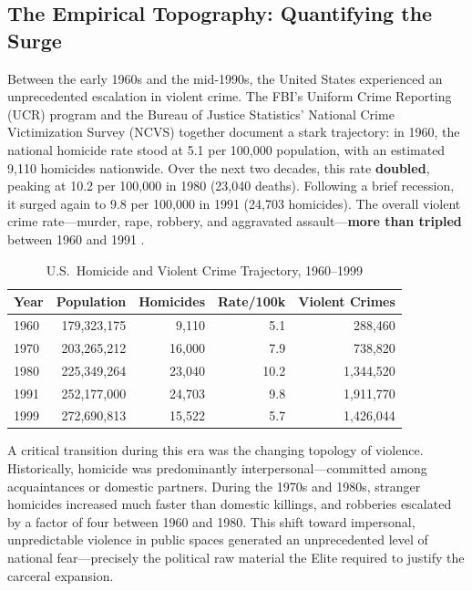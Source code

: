 \documentclass[12pt,openany]{book}
\begin{document}
\subsection{The Empirical Topography: Quantifying the Surge}

Between the early 1960s and the mid-1990s, the United States experienced an unprecedented escalation in violent crime. The FBI's Uniform Crime Reporting (UCR) program and the Bureau of Justice Statistics' National Crime Victimization Survey (NCVS) together document a stark trajectory: in 1960, the national homicide rate stood at 5.1 per 100,000 population, with an estimated 9,110 homicides nationwide. Over the next two decades, this rate \textbf{doubled}, peaking at 10.2 per 100,000 in 1980 (23,040 deaths). Following a brief recession, it surged again to 9.8 per 100,000 in 1991 (24,703 homicides). The overall violent crime rate---murder, rape, robbery, and aggravated assault---\textbf{more than tripled} between 1960 and 1991 \cite{ucr_historical, bjs_ncvs}.

\begin{table}[htbp]
\centering
\small
\caption{U.S.\ Homicide and Violent Crime Trajectory, 1960--1999}
\label{tab:crime_surge}
\begin{tabular}{lrrrr}
\toprule
\textbf{Year} & \textbf{Population} & \textbf{Homicides} & \textbf{Rate/100k} & \textbf{Violent Crimes} \\
\midrule
1960 & 179,323,175 & 9,110 & 5.1 & 288,460 \\
1970 & 203,265,212 & 16,000 & 7.9 & 738,820 \\
1980 & 225,349,264 & 23,040 & 10.2 & 1,344,520 \\
1991 & 252,177,000 & 24,703 & 9.8 & 1,911,770 \\
1999 & 272,690,813 & 15,522 & 5.7 & 1,426,044 \\
\bottomrule
\end{tabular}
\end{table}

A critical transition during this era was the changing topology of violence. Historically, homicide was predominantly interpersonal---committed among acquaintances or domestic partners. During the 1970s and 1980s, stranger homicides increased much faster than domestic killings, and robberies escalated by a factor of four between 1960 and 1980. This shift toward impersonal, unpredictable violence in public spaces generated an unprecedented level of national fear---precisely the political raw material the Elite required to justify the carceral expansion.
\end{document}
